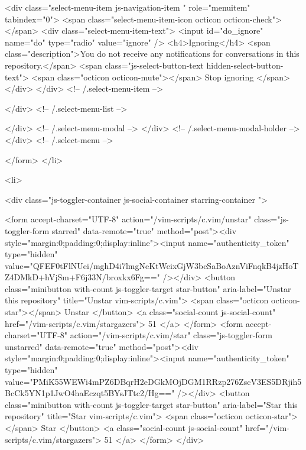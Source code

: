             <div class="select-menu-item js-navigation-item " role="menuitem" tabindex="0">
              <span class="select-menu-item-icon octicon octicon-check"></span>
              <div class="select-menu-item-text">
                <input id="do_ignore" name="do" type="radio" value="ignore" />
                <h4>Ignoring</h4>
                <span class="description">You do not receive any notifications for conversations in this repository.</span>
                <span class="js-select-button-text hidden-select-button-text">
                  <span class="octicon octicon-mute"></span>
                  Stop ignoring
                </span>
              </div>
            </div> <!-- /.select-menu-item -->

          </div> <!-- /.select-menu-list -->

        </div> <!-- /.select-menu-modal -->
      </div> <!-- /.select-menu-modal-holder -->
    </div> <!-- /.select-menu -->

</form>
    </li>

  <li>
    

  <div class="js-toggler-container js-social-container starring-container ">

    <form accept-charset="UTF-8" action="/vim-scripts/c.vim/unstar" class="js-toggler-form starred" data-remote="true" method="post"><div style="margin:0;padding:0;display:inline"><input name="authenticity_token" type="hidden" value="QFEF0tFlNUei/mghD4i7lmgNeKtWeixGjW3bcSaBoAznViFnqkB4jzHoTZ4DMkD+hVjSm+F6j33N/broxkx6Fg==" /></div>
      <button
        class="minibutton with-count js-toggler-target star-button"
        aria-label="Unstar this repository" title="Unstar vim-scripts/c.vim">
        <span class="octicon octicon-star"></span>
        Unstar
      </button>
        <a class="social-count js-social-count" href="/vim-scripts/c.vim/stargazers">
          51
        </a>
</form>
    <form accept-charset="UTF-8" action="/vim-scripts/c.vim/star" class="js-toggler-form unstarred" data-remote="true" method="post"><div style="margin:0;padding:0;display:inline"><input name="authenticity_token" type="hidden" value="PMiK55WEWi4mPZ6DBqrH2eDGkMOjDGM1RRzp276ZscV3ES5DRjih5BcCk5YN1p1JwO4haEczqt5BYsJTtc2/Hg==" /></div>
      <button
        class="minibutton with-count js-toggler-target star-button"
        aria-label="Star this repository" title="Star vim-scripts/c.vim">
        <span class="octicon octicon-star"></span>
        Star
      </button>
        <a class="social-count js-social-count" href="/vim-scripts/c.vim/stargazers">
          51
        </a>
</form>  </div>

